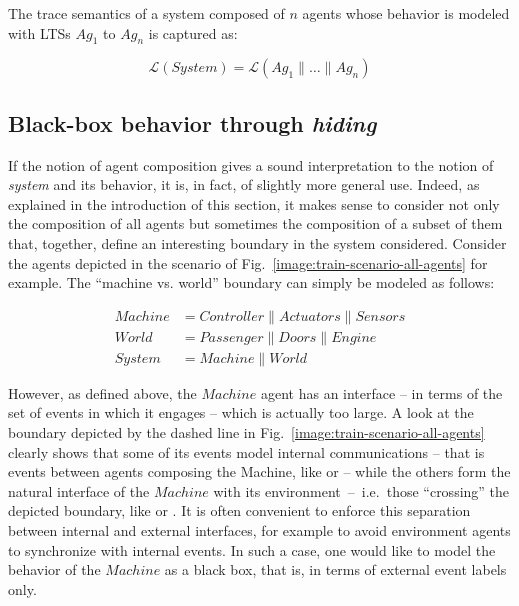 The trace semantics of a system composed of $n$ agents whose behavior is modeled with LTSs $Ag_1$ to $Ag_n$ is captured as:

\begin{equation}
\mathcal{L}(System) = \mathcal{L}(Ag_1 \parallel \ldots \parallel Ag_n)
\label{equation:system-composition}
\end{equation}

\subsection{Black-box behavior through \emph{hiding}}

If the notion of agent composition gives a sound interpretation to the notion of \emph{system} and its behavior, it is, in fact, of slightly more general use. Indeed, as explained in the introduction of this section, it makes sense to consider not only the composition of all agents but sometimes the composition of a subset of them that, together, define an interesting boundary in the system considered. Consider the agents depicted in the scenario of Fig.~\ref{image:train-scenario-all-agents} for example. The ``machine vs. world'' boundary can simply be modeled as follows:

\vspace{-0.8cm}
\begin{align*}
Machine &= Controller \parallel Actuators \parallel Sensors \\
World   &= Passenger \parallel Doors \parallel Engine \\
System  &= Machine \parallel World
\end{align*}
\vspace{-0.8cm}

However, as defined above, the $Machine$ agent has an interface -- in terms of the set of events in which it engages -- which is actually too large. A look at the boundary depicted by the dashed line in Fig.~\ref{image:train-scenario-all-agents} clearly shows that some of its events model internal communications -- that is events between agents composing the Machine, like  or  -- while the others form the natural interface of the $Machine$ with its environment~--~i.e.~those ``crossing'' the depicted boundary, like  or . It is often convenient to enforce this separation between internal and external interfaces, for example to avoid environment agents to synchronize with internal events. In such a case, one would like to model the behavior of the $Machine$ as a black box, that is, in terms of external event labels only.

